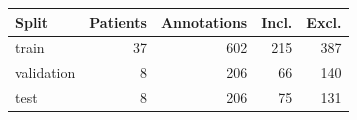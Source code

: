\begin{tabular}{lrrrr}\toprule
Split & Patients & Annotations & Incl. & Excl. \\\midrule
train & 37 & 602 & 215 & 387 \\
validation & 8 & 206 & 66 & 140 \\
test & 8 & 206 & 75 & 131 \\
\bottomrule\end{tabular}
